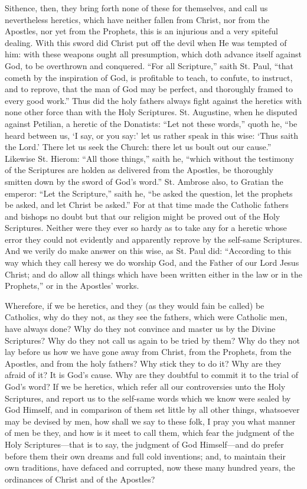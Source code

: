 Sithence, then, they bring forth none of these for themselves,
and call us nevertheless heretics, which have neither fallen from Christ,
nor from the Apostles, nor yet from the Prophets, this is an injurious
and a very spiteful dealing. With this sword did Christ put off
the devil when He was tempted of him: with these weapons ought all presumption,
which doth advance itself against God, to be overthrown and conquered.
“For all Scripture,” saith St. Paul, “that cometh
by the inspiration of God, is profitable to teach, to confute, to instruct,
and to reprove, that the man of God may be perfect, and thoroughly framed
to every good work.” Thus did the holy fathers always fight
against the heretics with none other force than with the Holy Scriptures.
St. Augustine, when he disputed against Petilian, a heretic of the Donatists:
“Let not these words,” quoth he, “be heard between
us, ‘I say, or you say:’ let us rather speak in this wise:
‘Thus saith the Lord.’ There let us seek the Church:
there let us boult out our cause.” Likewise St. Hierom:
“All those things,” saith he, “which without the testimony
of the Scriptures are holden as delivered from the Apostles, be thoroughly
smitten down by the sword of God’s word.” St. Ambrose
also, to Gratian the emperor: “Let the Scripture,” saith
he, “be asked the question, let the prophets be asked, and let
Christ be asked.” For at
that time made the Catholic fathers and bishops no doubt but that our
religion might be proved out of the Holy Scriptures. Neither were
they ever so hardy as to take any for a heretic whose error they could
not evidently and apparently reprove by the self-same Scriptures.
And we verily do make answer on this wise, as St. Paul did: “According
to this way which they call heresy we do worship God, and the Father
of our Lord Jesus Christ; and do allow all things which have been written
either in the law or in the Prophets,” or in the Apostles’
works.

Wherefore, if we be heretics, and they (as they would fain be called)
be Catholics, why do they not, as they see the fathers, which were Catholic
men, have always done? Why do they not convince and master us
by the Divine Scriptures? Why do they not call us again to be
tried by them? Why do they not lay before us how we have gone
away from Christ, from the Prophets, from the Apostles, and from the
holy fathers? Why stick they to do it? Why are they afraid
of it? It is God’s cause. Why are they doubtful to
commit it to the trial of God’s word? If we be heretics,
which refer all our controversies unto the Holy Scriptures, and report
us to the self-same words which we know were sealed by God Himself,
and
in comparison of them set little by all other things, whatsoever may
be devised by men, how shall we say to these folk, I pray you what manner
of men be they, and how is it meet to call them, which fear the judgment
of the Holy Scriptures—that is to say, the judgment of God Himself—and
do prefer before them their own dreams and full cold inventions; and,
to maintain their own traditions, have defaced and corrupted, now these
many hundred years, the ordinances of Christ and of the Apostles?

